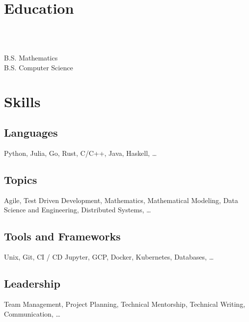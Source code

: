 \documentclass{tc_cv}
\begin{document}

\begin{minipage}[t]{0.3\linewidth}

  \vspace{2em}
  \section{Education}
  \\
  \date{Fall 2011 --- Spring 2016}\vspace{0.25em}\\
  \faGraduationCap \hspace{1ex} B.S. Mathematics\\
  \faGraduationCap \hspace{1ex} B.S. Computer Science

  \vspace{2em}
  \section{Skills}
  \subsection{Languages}
  Python,
  Julia,
  Go,
  Rust,
  C/C++,
  Java,
  Haskell,
  \ldots

  \subsection{Topics}
  Agile,
  Test Driven Development,
  Mathematics,
  Mathematical Modeling,
  Data Science and Engineering,
  Distributed Systems,
  \ldots

  \subsection{Tools and Frameworks}
  Unix,
  Git,
  CI / CD
  Jupyter,
  GCP,
  Docker,
  Kubernetes,
  Databases,
  \ldots

  \subsection{Leadership}
  Team Management,
  Project Planning,
  Technical Mentorship,
  Technical Writing,
  Communication,
  \ldots


\end{minipage}
\end{document}
